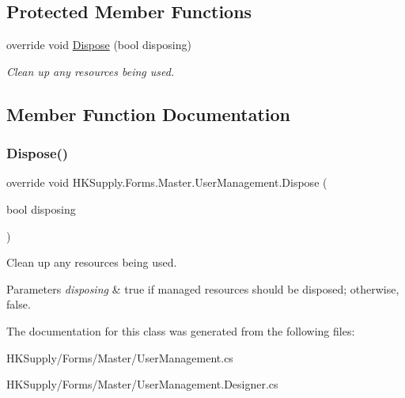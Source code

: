 \subsection*{Protected Member Functions}
\begin{DoxyCompactItemize}
\item 
override void \hyperlink{class_h_k_supply_1_1_forms_1_1_master_1_1_user_management_a785e8f8b502b3ac465677f0817b29023}{Dispose} (bool disposing)
\begin{DoxyCompactList}\small\item\em Clean up any resources being used. \end{DoxyCompactList}\end{DoxyCompactItemize}


\subsection{Member Function Documentation}
\mbox{\label{class_h_k_supply_1_1_forms_1_1_master_1_1_user_management_a785e8f8b502b3ac465677f0817b29023}} 
\subsubsection{\texorpdfstring{Dispose()}{Dispose()}}
{\footnotesize\ttfamily override void H\+K\+Supply.\+Forms.\+Master.\+User\+Management.\+Dispose (\begin{DoxyParamCaption}\item[{bool}]{disposing }\end{DoxyParamCaption})\hspace{0.3cm}{\ttfamily [protected]}}



Clean up any resources being used. 


\begin{DoxyParams}{Parameters}
{\em disposing} & true if managed resources should be disposed; otherwise, false.\\
\hline
\end{DoxyParams}


The documentation for this class was generated from the following files\+:\begin{DoxyCompactItemize}
\item 
H\+K\+Supply/\+Forms/\+Master/User\+Management.\+cs\item 
H\+K\+Supply/\+Forms/\+Master/User\+Management.\+Designer.\+cs\end{DoxyCompactItemize}

